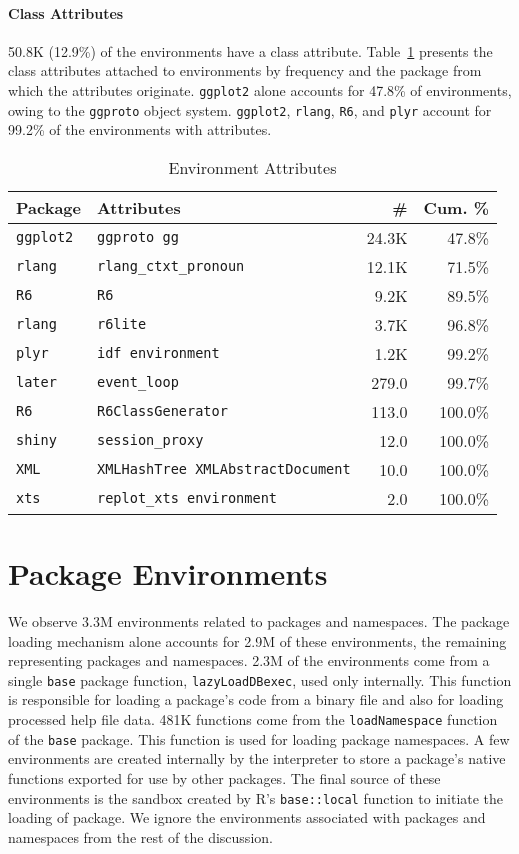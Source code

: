 \documentclass[10pt,review,sigplan,anonymous=true,authorversion=true,nonacm=true]{acmart}
\newcommand{\code}[1]{\lstinline |#1|\xspace}
\newcommand{\base}{\code{base}}
\newcommand{\lazyLoadDBexec}{\code{lazyLoadDBexec}}
\begin{document}
\paragraph{Class Attributes}
50.8K (12.9\%) of the environments have a class attribute.
Table~\ref{table:explicit_env_attr} presents the class attributes attached to
environments by frequency and the package from which the attributes originate.
\code{ggplot2} alone accounts for 47.8\% of environments, owing to the
\code{ggproto} object system. \code{ggplot2}, \code{rlang}, \code{R6}, and
\code{plyr} account for 99.2\% of the environments with attributes.
\begin{table}[!h]
  \vspace{-3mm}
  \small
  \caption{Environment Attributes} \label{table:explicit_env_attr}
  \centering
  \begin{tabular}{llrr}
    \toprule
    \textbf{Package}&\textbf{Attributes}&\textbf{\#}&\textbf{Cum. \%}\\
    \midrule
    \texttt{ggplot2}&\texttt{ggproto gg}&24.3K&47.8\%\\
    \texttt{rlang}&\texttt{rlang\_ctxt\_pronoun}&12.1K&71.5\%\\
    \texttt{R6}&\texttt{R6}&9.2K&89.5\%\\
    \texttt{rlang}&\texttt{r6lite}&3.7K&96.8\%\\
    \texttt{plyr}&\texttt{idf environment}&1.2K&99.2\%\\
    \texttt{later}&\texttt{event\_loop}&279.0&99.7\%\\
    \texttt{R6}&\texttt{R6ClassGenerator}&113.0&100.0\%\\
    \texttt{shiny}&\texttt{session\_proxy}&12.0&100.0\%\\
    \texttt{XML}&\texttt{XMLHashTree XMLAbstractDocument}&10.0&100.0\%\\
    \texttt{xts}&\texttt{replot\_xts environment}&2.0&100.0\%\\
    \bottomrule
  \end{tabular}
\end{table}


\section{Package Environments}
We observe 3.3M environments related to packages and namespaces. The package
loading mechanism alone accounts for 2.9M of these environments, the remaining
representing packages and namespaces. 2.3M of the environments come from a
single \base package function, \lazyLoadDBexec, used only internally. This
function is responsible for loading a package's code from a binary file and also
for loading processed help file data. 481K functions come from the
\code{loadNamespace} function of the \code{base} package. This function is used
for loading package namespaces. A few environments are created internally by the
interpreter to store a package's native functions exported for use by other
packages. The final source of these environments is the sandbox created by R's
\code{base::local} function to initiate the loading of package. We ignore the
environments associated with packages and namespaces from the rest of the
discussion.



\end{document}
